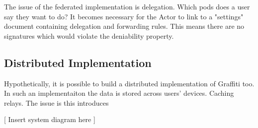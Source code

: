 The issue of the federated implementation is delegation.
Which pods does a user say they want to do?
It becomes necessary for the Actor to link to a "settings" document
containing delegation and forwarding rules.
This means there are no signatures which would violate the deniability property.

\subsection{Distributed Implementation}

Hypothetically, it is possible to build a distributed implementation of Graffiti too.
In such an implementaiton the data is stored across users' devices.
Caching relays.
The issue is this introduces

[ Insert system diagram here ]






